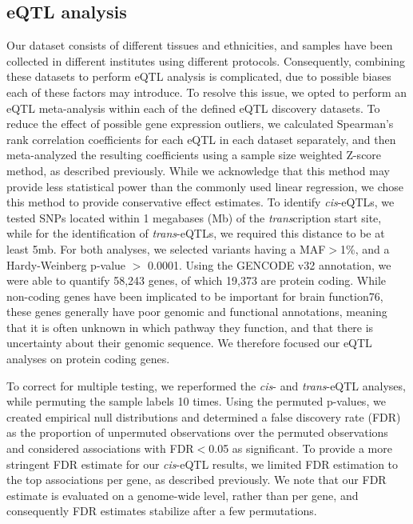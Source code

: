 \subsection{eQTL analysis}
Our dataset consists of different tissues and ethnicities, and samples have been collected in different institutes using different protocols. Consequently, combining these datasets to perform eQTL analysis is complicated, due to possible biases each of these factors may introduce. To resolve this issue, we opted to perform an eQTL meta-analysis within each of the defined eQTL discovery datasets. To reduce the effect of possible gene expression outliers, we calculated Spearman’s rank correlation coefficients for each eQTL in each dataset separately, and then meta-analyzed the resulting coefficients using a sample size weighted Z-score method, as described previously\cite{vosaUnravelingPolygenicArchitecture2018}. While we acknowledge that this method may provide less statistical power than the commonly used linear regression, we chose this method to provide conservative effect estimates. To identify \textit{cis}-eQTLs, we tested SNPs located within 1 megabases (Mb) of the \textit{trans}cription start site, while for the identification of \textit{trans}-eQTLs, we required this distance to be at least 5mb. For both analyses, we selected variants having a MAF$>$1\%, and a Hardy-Weinberg p-value $>$ 0.0001. Using the GENCODE v32 annotation, we were able to quantify 58,243 genes, of which 19,373 are protein coding. While non-coding genes have been implicated to be important for brain function76, these genes generally have poor genomic and functional annotations, meaning that it is often unknown in which pathway they function, and that there is uncertainty about their genomic sequence. We therefore focused our eQTL analyses on protein coding genes. 

To correct for multiple testing, we reperformed the \textit{cis}- and \textit{trans}-eQTL analyses, while permuting the sample labels 10 times. Using the permuted p-values, we created empirical null distributions and determined a false discovery rate (FDR) as the proportion of unpermuted observations over the permuted observations and considered associations with FDR$<$0.05 as significant. To provide a more stringent FDR estimate for our \textit{cis}-eQTL results, we limited FDR estimation to the top associations per gene, as described previously\cite{vosaUnravelingPolygenicArchitecture2018}. We note that our FDR estimate is evaluated on a genome-wide level, rather than per gene, and consequently FDR estimates stabilize after a few permutations\cite{westraSystematicIdentificationTranseQTLs2013}. 

